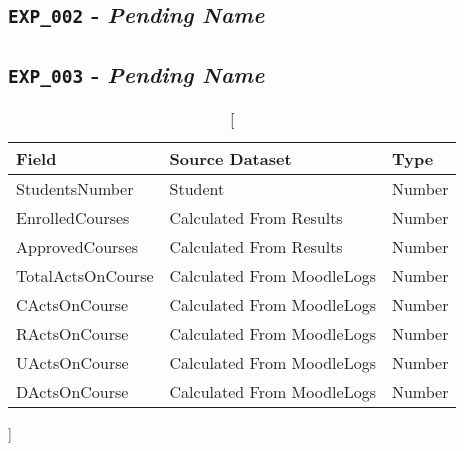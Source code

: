 \subsection{\texttt{EXP\_002} - \textit{Pending Name}}


\subsection{\texttt{EXP\_003} - \textit{Pending Name}}

\begin{table}[h!]
    \centering

    \begin{tabular}{| l | l | l |}
        \hline
        \textbf{Field}    & \textbf{Source Dataset}    & \textbf{Type} \\ \hline
        StudentsNumber    & Student                    & Number        \\ \hline
        EnrolledCourses   & Calculated From Results    & Number        \\ \hline
        ApprovedCourses   & Calculated From Results    & Number        \\ \hline
        TotalActsOnCourse & Calculated From MoodleLogs & Number        \\ \hline
        CActsOnCourse     & Calculated From MoodleLogs & Number        \\ \hline
        RActsOnCourse     & Calculated From MoodleLogs & Number        \\ \hline
        UActsOnCourse     & Calculated From MoodleLogs & Number        \\ \hline
        DActsOnCourse     & Calculated From MoodleLogs & Number        \\ \hline
    \end{tabular}

    \caption
        []
        {}

    \label{tab:exp_003}
\end{table}

